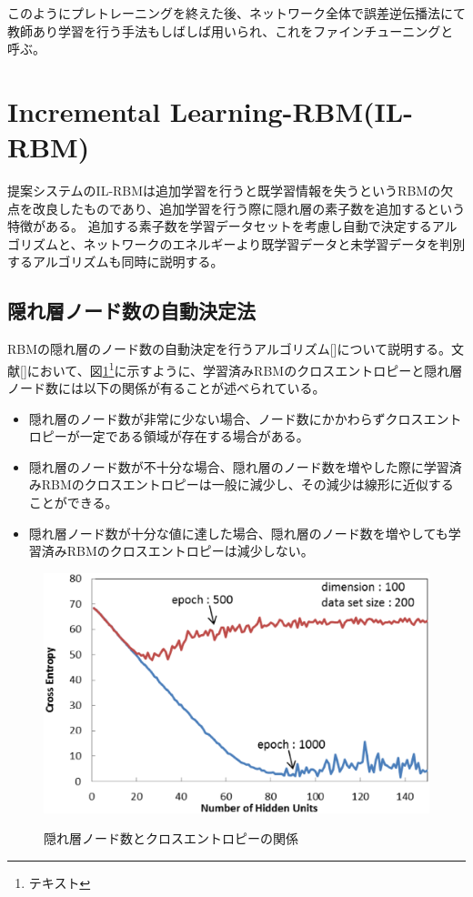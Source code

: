 このようにプレトレーニングを終えた後、ネットワーク全体で誤差逆伝播法にて教師あり学習を行う手法もしばしば用いられ、これをファインチューニングと呼ぶ。

\section{Incremental Learning-RBM(IL-RBM)}\label{sec:rbm}

提案システムのIL-RBMは追加学習を行うと既学習情報を失うというRBMの欠点を改良したものであり、追加学習を行う際に隠れ層の素子数を追加するという特徴がある。
追加する素子数を学習データセットを考慮し自動で決定するアルゴリズムと、ネットワークのエネルギーより既学習データと未学習データを判別するアルゴリズムも同時に説明する。

\subsection{隠れ層ノード数の自動決定法}\label{sec:node}
RBMの隠れ層のノード数の自動決定を行うアルゴリズム[]について説明する。文献[]において、図\ref{fig:pre_exp_line}\footnote{テキスト}に示すように、学習済みRBMのクロスエントロピーと隠れ層ノード数には以下の関係が有ることが述べられている。

\begin{itemize}
 \item  隠れ層のノード数が非常に少ない場合、ノード数にかかわらずクロスエントロピーが一定である領域が存在する場合がある。
  \item 隠れ層のノード数が不十分な場合、隠れ層のノード数を増やした際に学習済みRBMのクロスエントロピーは一般に減少し、その減少は線形に近似することができる。
  \item 隠れ層ノード数が十分な値に達した場合、隠れ層のノード数を増やしても学習済みRBMのクロスエントロピーは減少しない。 　
\end{itemize}

\begin{figure}[]
\begin{center}
   \includegraphics[scale=0.48]{./myimg/pre_exp1_c.eps} \\
   \caption{隠れ層ノード数とクロスエントロピーの関係}
  \label{fig:pre_exp_line}
\end{center}
\end{figure}

